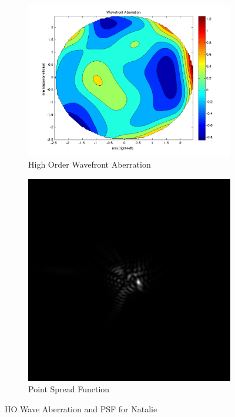 \documentclass{article}
\begin{document}
\clearpage

\begin{figure}[H]
\begin{subfigure}{.5\textwidth}
  \centering
  \includegraphics[width=1\linewidth]{Natalie_WFA.png}
  \caption{High Order Wavefront Aberration}
  \label{fig:nataliehowa}
\end{subfigure}%
\begin{subfigure}{.5\textwidth}
  \centering
  \includegraphics[width=.8\linewidth]{Natalie_PSF.png}
  \caption{Point Spread Function}
  \label{fig:nataliepsf}
\end{subfigure}
\caption{HO Wave Aberration and PSF for Natalie}
\label{fig:natalie}
\end{figure}
\end{document}
